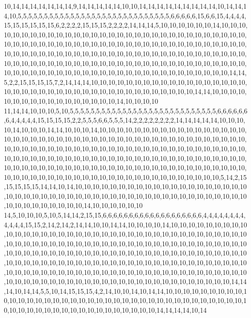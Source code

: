 10,14,14,14,14,14,14,14,9,14,14,14,14,14,10,10,14,14,14,14,14,14,14,14,14,10,14,14,14,10,5,5,5,5,5,5,5,5,5,5,5,5,5,5,5,5,5,5,5,5,5,5,5,5,5,5,5,5,5,6,6,6,6,6,15,6,6,15,4,4,4,4,15,15,15,15,15,15,6,2,2,2,2,15,15,15,2,2,2,2,14,14,14,5,10,10,10,10,10,10,14,10,10,10,10,10,10,10,10,10,10,10,10,10,10,10,10,10,10,10,10,10,10,10,10,10,10,10,10,10,10,10,10,10,10,10,10,10,10,10,10,10,10,10,10,10,10,10,10,10,10,10,10,10,10,10,10,10,10,10,10,10,10,10,10,10,10,10,10,10,10,10,10,10,10,10,10,10,10,10,10,10,10,10,10,10,10,10,10,10,10,10,10,10,10,10,10,10,10,10,10,10,10,10,10,10,10,10,10,10,10,10,10,10,10,10,10,10,10,10,10,10,10,10,10,10,10,10,10,10,10,10,10,10,10,10,10,10,10,10,10,10,14,14,5,2,2,15,15,15,15,7,2,14,14,14,10,10,10,10,10,10,10,10,10,10,10,10,10,10,10,10,10,10,10,10,10,10,10,10,10,10,10,10,10,10,10,10,10,10,10,10,10,10,10,10,14,14,10,10,10,10,10,10,10,10,10,10,10,10,10,10,10,10,10,14,10,10,10,10
11,14,14,10,10,10,5,10,5,5,5,5,5,5,5,5,5,5,5,5,5,5,5,5,5,5,5,5,5,5,5,5,5,5,5,5,6,6,6,6,6,6,6,4,4,4,4,4,15,15,15,15,2,2,5,5,5,6,6,5,5,5,14,2,2,2,2,2,2,2,2,14,14,14,14,14,10,10,10,10,14,10,10,10,14,14,10,10,10,14,10,10,10,10,10,10,10,10,10,10,10,10,10,10,10,10,10,10,10,10,10,10,10,10,10,10,10,10,10,10,10,10,10,10,10,10,10,10,10,10,10,10,10,10,10,10,10,10,10,10,10,10,10,10,10,10,10,10,10,10,10,10,10,10,10,10,10,10,10,10,10,10,10,10,10,10,10,10,10,10,10,10,10,10,10,10,10,10,10,10,10,10,10,10,10,10,10,10,10,10,10,10,10,10,10,10,10,10,10,10,10,10,10,10,10,10,10,10,10,10,10,10,10,10,10,10,10,10,10,10,10,10,10,10,10,10,10,10,10,10,10,10,10,10,10,10,10,10,10,10,10,10,10,10,5,14,2,15,15,15,15,15,14,14,10,14,10,10,10,10,10,10,10,10,10,10,10,10,10,10,10,10,10,10,10,10,10,10,10,10,10,10,10,10,10,10,10,10,10,10,10,10,10,10,10,10,10,10,10,10,10,10,10,10,10,10,10,10,10,10,10,10,10,14,10,10,10,10,10,10
14,5,10,10,10,5,10,5,14,14,2,15,15,6,6,6,6,6,6,6,6,6,6,6,6,6,6,6,6,6,6,6,4,4,4,4,4,4,4,4,4,4,4,4,15,15,2,14,2,14,2,14,14,10,10,14,14,10,10,10,10,14,10,10,10,10,10,10,10,10,10,10,10,10,10,10,10,10,10,10,10,10,10,10,10,10,10,10,10,10,10,10,10,10,10,10,10,10,10,10,10,10,10,10,10,10,10,10,10,10,10,10,10,10,10,10,10,10,10,10,10,10,10,10,10,10,10,10,10,10,10,10,10,10,10,10,10,10,10,10,10,10,10,10,10,10,10,10,10,10,10,10,10,10,10,10,10,10,10,10,10,10,10,10,10,10,10,10,10,10,10,10,10,10,10,10,10,10,10,10,10,10,10,10,10,10,10,10,10,10,10,10,10,10,10,10,10,10,10,10,10,10,10,10,10,10,10,10,10,10,10,10,10,10,10,10,10,10,10,10,10,10,10,10,10,10,10,10,10,10,10,10,10,10,10,10,10,14,14,14,10,14,14,5,5,10,14,15,15,15,4,2,14,10,10,14,10,14,14,10,10,10,10,10,10,10,10,10,10,10,10,10,10,10,10,10,10,10,10,10,10,10,10,10,10,10,10,10,10,10,10,10,10,10,10,10,10,10,10,10,10,10,10,10,10,10,10,10,10,10,10,10,10,10,14,14,14,14,10,14
